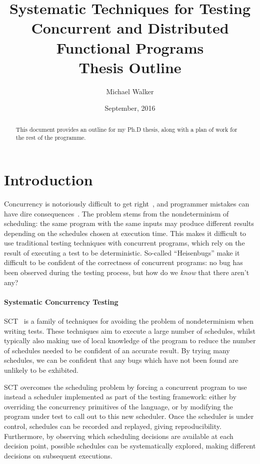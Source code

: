 \documentclass{article}
\title{Systematic Techniques for Testing Concurrent and Distributed Functional Programs \\ \large Thesis Outline}
\author{Michael Walker}
\date{September, 2016}
\begin{document}
\maketitle

\begin{abstract}
  This document provides an outline for my Ph.D thesis, along with a
  plan of work for the rest of the programme.
\end{abstract}

\tableofcontents

\pagebreak

\section{Introduction}

Concurrency is notoriously difficult to get right~\cite{yang2013}, and
programmer mistakes can have dire consequences~\cite{leveson1993}. The
problem stems from the nondeterminism of scheduling: the same program
with the same inputs may produce different results depending on the
schedules chosen at execution time. This makes it difficult to use
traditional testing techniques with concurrent programs, which rely on
the result of executing a test to be deterministic. So-called
``Heisenbugs'' make it difficult to be confident of the correctness of
concurrent programs: no bug has been observed during the testing
process, but how do we \emph{know} that there aren't any?

\paragraph{Systematic Concurrency Testing}
SCT~\cite{emmi2011,musuvathi2007,musuvathi2008,thomson2014} is a family
of techniques for avoiding the problem of nondeterminism when writing
tests. These techniques aim to execute a large number of schedules,
whilst typically also making use of local knowledge of the program to
reduce the number of schedules needed to be confident of an accurate
result. By trying many schedules, we can be confident that any bugs
which have not been found are unlikely to be exhibited.

SCT overcomes the scheduling problem by forcing a concurrent program
to use instead a scheduler implemented as part of the testing
framework: either by overriding the concurrency primitives of the
language, or by modifying the program under test to call out to this
new scheduler. Once the scheduler is under control, schedules can be
recorded and replayed, giving reproducibility. Furthermore, by
observing which scheduling decisions are available at each decision
point, possible schedules can be systematically explored, making
different decisions on subsequent executions.
\end{document}
